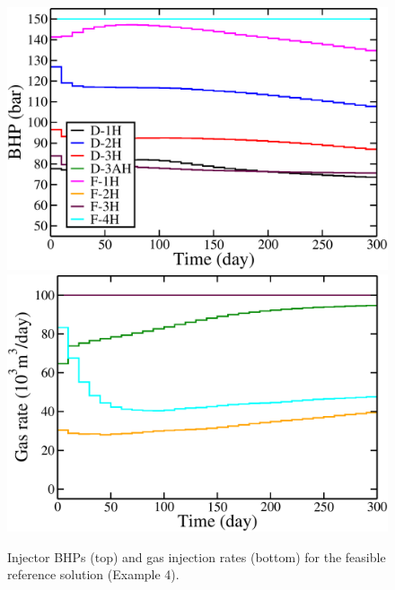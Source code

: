 \documentclass[twocolumn,numbook]{svjour3}          %
\begin{document}
\begin{figure}
\begin{center}
\includegraphics[totalheight=2.2in,angle=0]{norneReferenceChoppedT300_BHP.pdf}
\includegraphics[totalheight=2.2in,angle=0]{norneReferenceChoppedT300_rate_gas.pdf}
\end{center}
\caption{Injector BHPs (top) and gas injection rates (bottom) for the feasible reference solution (Example 4).}
\label{fig:NorneReferenceRates}
\end{figure}
\end{document}
